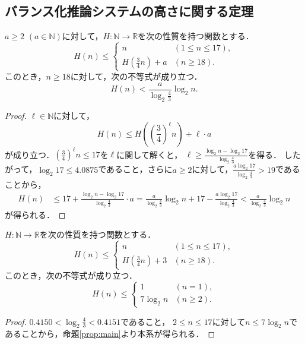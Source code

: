 \subsection{バランス化推論システムの高さに関する定理}
\begin{proposition}\label{prop:main}
  $a \geq 2$ $(a\in\mathbb{N})$に対して，$H:\mathbb{N}\rightarrow \mathbb{R}$を次の性質を持つ関数とする．
$$H(n) \leq 
\begin{cases}
n & (1\leq n \leq 17),\\
H(\frac{3}{4}n) + a & (n\geq 18).
\end{cases}
$$
  このとき，$n\geq 18$に対して，次の不等式が成り立つ．
  $$
  H(n) < \frac{a}{\log_{2}\frac{4}{3}} \log_{2} n.
  $$
\end{proposition}

\begin{proof}
$\ell \in \mathbb{N}$に対して，
$$
H(n) \leq H\left(\left(\frac{3}{4}\right)^{\ell}n\right) + \ell\cdot a
$$
が成り立つ．$\left(\frac{3}{4}\right)^{\ell}n\leq 17$を$\ell$に関して解くと，
$\displaystyle\ell\geq \frac{\log_{2}n - \log_{2}17}{\log_{2}\frac{4}{3}}$を得る．
したがって，$\log_{2}17 \leq 4.0875$であること，さらに$a\geq 2$に対して，$\displaystyle\frac{a\log_{2}17}{\log_{2}\frac{4}{3}} > 19$であることから，
\begin{align*}
H(n) & \leq 17 + \frac{\log_{2}n - \log_{2}17}{\log_{2}\frac{4}{3}}\cdot a
 = \frac{a}{\log_{2}\frac{4}{3}}\log_{2}n + 17 - \frac{a\log_{2}17}{\log_{2}\frac{4}{3}} < \frac{a}{\log_{2}\frac{4}{3}} \log_{2} n
\end{align*}
が得られる．
\end{proof}

\begin{corollary}\label{cor:2}
  $H:\mathbb{N}\rightarrow \mathbb{R}$を次の性質を持つ関数とする．
$$H(n) \leq 
\begin{cases}
n & (1\leq n \leq 17),\\
H(\frac{3}{4}n) + 3 & (n\geq 18).
\end{cases}
$$
このとき，次の不等式が成り立つ．
$$H(n) \leq 
\begin{cases}
1 & (n = 1),\\
7 \log_{2}n & (n\geq 2).
\end{cases}
$$
\end{corollary}

\begin{proof}
$0.4150 < \log_{2}\frac{4}{3} < 0.4151$であること，
$2\leq n\leq 17$に対して$n \leq 7\log_{2}n$であることから，命題\ref{prop:main}より本系が得られる．
\end{proof}

